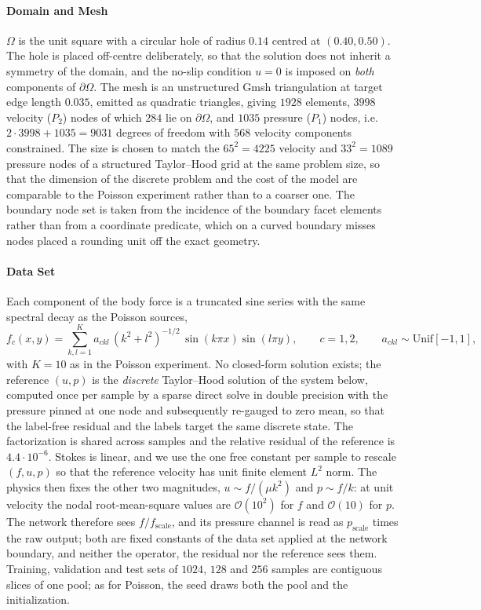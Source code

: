 \documentclass{article} %
\begin{document}
\paragraph{Domain and Mesh} $\Omega$ is the unit square with a circular hole of radius $0.14$ centred at $(0.40, 0.50)$. The hole is placed off-centre deliberately, so that the solution does not inherit a symmetry of the domain, and the no-slip condition $u = 0$ is imposed on \emph{both} components of $\partial\Omega$. The mesh is an unstructured Gmsh triangulation at target edge length $0.035$, emitted as quadratic triangles, giving $1928$ elements, $3998$ velocity ($P_2$) nodes of which $284$ lie on $\partial\Omega$, and $1035$ pressure ($P_1$) nodes, i.e.\ $2\cdot 3998 + 1035 = 9031$ degrees of freedom with $568$ velocity components constrained. The size is chosen to match the $65^2 = 4225$ velocity and $33^2 = 1089$ pressure nodes of a structured Taylor--Hood grid at the same problem size, so that the dimension of the discrete problem and the cost of the model are comparable to the Poisson experiment rather than to a coarser one. The boundary node set is taken from the incidence of the boundary facet elements rather than from a coordinate predicate, which on a curved boundary misses nodes placed a rounding unit off the exact geometry.

\paragraph{Data Set} Each component of the body force is a truncated sine series with the same spectral decay as the Poisson sources,
\begin{equation}\label{eq:appendix_stokes_data}
   f_c(x,y) = \sum_{k,l=1}^{K} a_{ckl}\,(k^2+l^2)^{-1/2}\,\sin(k\pi x)\sin(l\pi y), \qquad c = 1, 2, \qquad a_{ckl} \sim \mathrm{Unif}[-1,1],
\end{equation}
with $K = 10$ as in the Poisson experiment. No closed-form solution exists; the reference $(u, p)$ is the \emph{discrete} Taylor--Hood solution of the system below, computed once per sample by a sparse direct solve in double precision with the pressure pinned at one node and subsequently re-gauged to zero mean, so that the label-free residual and the labels target the same discrete state. The factorization is shared across samples and the relative residual of the reference is $4.4\cdot 10^{-6}$. Stokes is linear, and we use the one free constant per sample to rescale $(f, u, p)$ so that the reference velocity has unit finite element $L^2$ norm. The physics then fixes the other two magnitudes, $u \sim f/(\mu k^2)$ and $p \sim f/k$: at unit velocity the nodal root-mean-square values are $\mathcal O(10^2)$ for $f$ and $\mathcal O(10)$ for $p$. The network therefore sees $f / f_{\mathrm{scale}}$, and its pressure channel is read as $p_{\mathrm{scale}}$ times the raw output; both are fixed constants of the data set applied at the network boundary, and neither the operator, the residual nor the reference sees them. Training, validation and test sets of $1024$, $128$ and $256$ samples are contiguous slices of one pool; as for Poisson, the seed draws both the pool and the initialization.
\end{document}
